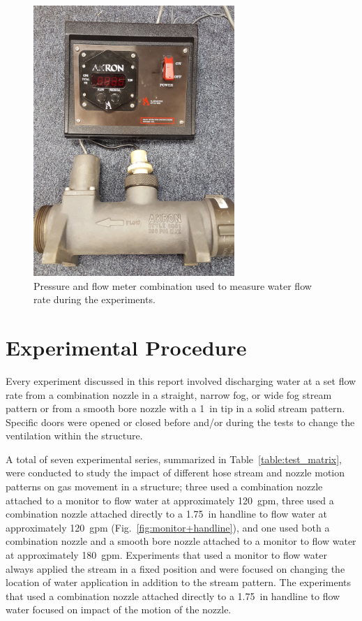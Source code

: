 \documentclass[12pt,oneside]{book}
\begin{document}
\begin{figure}[!ht]
	\includegraphics[width=3in]{../Figures/Pictures/flow_meter}
	\caption[Flow meter used to measure flow rate during experiments.]{Pressure and flow meter combination used to measure water flow rate during the experiments.}
	\label{fig:flow_meter}
\end{figure}
\FloatBarrier

\section{Experimental Procedure}
\label{sec:exp_procedure}
Every experiment discussed in this report involved discharging water at a set flow rate from a combination nozzle in a straight, narrow fog, or wide fog stream pattern or from a smooth bore nozzle with a 1~in tip in a solid stream pattern. Specific doors were opened or closed before and/or during the tests to change the ventilation within the structure. 

A total of seven experimental series, summarized in Table~\ref{table:test_matrix}, were conducted to study the impact of different hose stream and nozzle motion patterns on gas movement in a structure; three used a combination nozzle attached to a monitor to flow water at approximately 120~gpm, three used a combination nozzle attached directly to a 1.75~in handline to flow water at approximately 120~gpm (Fig.~\ref{fig:monitor+handline}), and one used both a combination nozzle and a smooth bore nozzle attached to a monitor to flow water at approximately 180~gpm. Experiments that used a monitor to flow water always applied the stream in a fixed position and were focused on changing the location of water application in addition to the stream pattern. The experiments that used a combination nozzle attached directly to a 1.75~in handline to flow water focused on impact of the motion of the nozzle.
\end{document}
